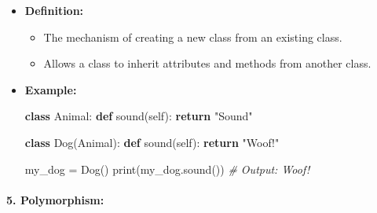 \documentclass[11pt]{article}
\providecommand{\tightlist}{%
      \setlength{\itemsep}{0pt}\setlength{\parskip}{0pt}}
\newenvironment{Shaded}{}{}
\newcommand{\KeywordTok}[1]{\textcolor[rgb]{0.00,0.44,0.13}{\textbf{{#1}}}}
\newcommand{\StringTok}[1]{\textcolor[rgb]{0.25,0.44,0.63}{{#1}}}
\newcommand{\CommentTok}[1]{\textcolor[rgb]{0.38,0.63,0.69}{\textit{{#1}}}}
\newcommand{\NormalTok}[1]{{#1}}
\newcommand{\VariableTok}[1]{\textcolor[rgb]{0.10,0.09,0.49}{{#1}}}
\newcommand{\ControlFlowTok}[1]{\textcolor[rgb]{0.00,0.44,0.13}{\textbf{{#1}}}}
\newcommand{\OperatorTok}[1]{\textcolor[rgb]{0.40,0.40,0.40}{{#1}}}
\newcommand{\BuiltInTok}[1]{{#1}}
\begin{document}
\begin{itemize}
\item
  \textbf{Definition:}

  \begin{itemize}
  \tightlist
  \item
    The mechanism of creating a new class from an existing class.
  \item
    Allows a class to inherit attributes and methods from another class.
  \end{itemize}
\item
  \textbf{Example:}

\begin{Shaded}
\begin{Highlighting}[]
\KeywordTok{class}\NormalTok{ Animal:}
    \KeywordTok{def}\NormalTok{ sound(}\VariableTok{self}\NormalTok{):}
        \ControlFlowTok{return} \StringTok{"Sound"}

\KeywordTok{class}\NormalTok{ Dog(Animal):}
    \KeywordTok{def}\NormalTok{ sound(}\VariableTok{self}\NormalTok{):}
        \ControlFlowTok{return} \StringTok{"Woof!"}

\NormalTok{my_dog }\OperatorTok{=}\NormalTok{ Dog()}
\BuiltInTok{print}\NormalTok{(my_dog.sound())  }\CommentTok{# Output: Woof!}
\end{Highlighting}
\end{Shaded}
\end{itemize}

\paragraph{\texorpdfstring{5.
\textbf{Polymorphism:}}{5. Polymorphism:}}\label{polymorphism}
\end{document}
